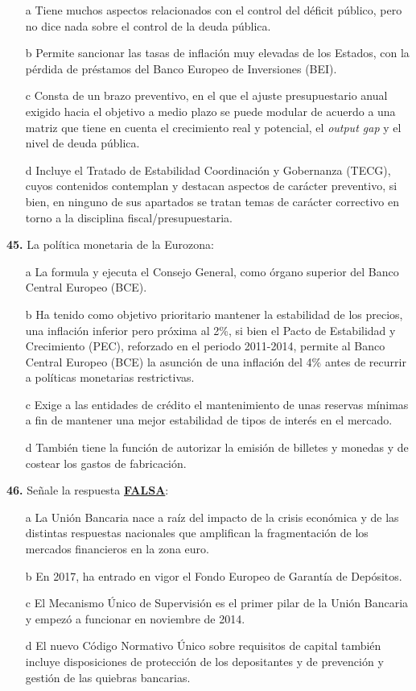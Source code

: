 \documentclass{nuevotema}
\begin{document}
\begin{itemize}
	\item[a] Tiene muchos aspectos relacionados con el control del déficit público, pero no dice nada sobre el control de la deuda pública.
	\item[b] Permite sancionar las tasas de inflación muy elevadas de los Estados, con la pérdida de préstamos del Banco Europeo de Inversiones (BEI).
	\item[c] Consta de un brazo preventivo, en el que el ajuste presupuestario anual exigido hacia el objetivo a medio plazo se puede modular de acuerdo a una matriz que tiene en cuenta el crecimiento real y potencial, el \textit{output gap} y el nivel de deuda pública.
	\item[d] Incluye el Tratado de Estabilidad Coordinación y Gobernanza (TECG), cuyos contenidos contemplan y destacan aspectos de carácter preventivo, si bien, en ninguno de sus apartados se tratan temas de carácter correctivo en torno a la disciplina fiscal/presupuestaria.
\end{itemize}

\textbf{45.} La política monetaria de la Eurozona:

\begin{itemize}
	\item[a] La formula y ejecuta el Consejo General, como órgano superior del Banco Central Europeo (BCE).
	\item[b] Ha tenido como objetivo prioritario mantener la estabilidad de los precios, una inflación inferior pero próxima al 2\%, si bien el Pacto de Estabilidad y Crecimiento (PEC), reforzado en el periodo 2011-2014, permite al Banco Central Europeo (BCE) la asunción de una inflación del 4\% antes de recurrir a políticas monetarias restrictivas.
	\item[c] Exige a las entidades de crédito el mantenimiento de unas reservas mínimas a fin de mantener una mejor estabilidad de tipos de interés en el mercado.
	\item[d] También tiene la función de autorizar la emisión de billetes y monedas y de costear los gastos de fabricación.
\end{itemize}

\textbf{46.} Señale la respuesta \underline{\textbf{FALSA}}:

\begin{itemize}
	\item[a] La Unión Bancaria nace a raíz del impacto de la crisis económica y de las distintas respuestas nacionales que amplifican la fragmentación de los mercados financieros en la zona euro.
	\item[b] En 2017, ha entrado en vigor el Fondo Europeo de Garantía de Depósitos.
	\item[c] El Mecanismo Único de Supervisión es el primer pilar de la Unión Bancaria y empezó a funcionar en noviembre de 2014.
	\item[d] El nuevo Código Normativo Único sobre requisitos de capital también incluye disposiciones de protección de los depositantes y de prevención y gestión de las quiebras bancarias.
\end{itemize}
\end{document}

